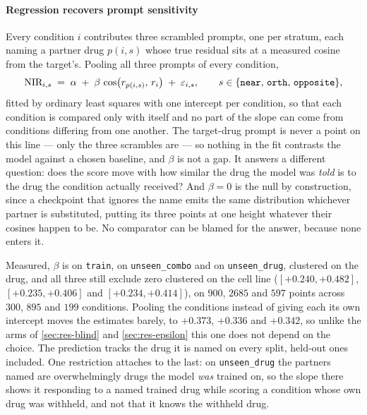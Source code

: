 \paragraph{Regression recovers prompt sensitivity} 

Every condition $i$ contributes three scrambled prompts, one per stratum,
each naming a partner drug $p(i,s)$ whose true residual sits at a measured cosine
from the target's. Pooling all three prompts of every condition,
\begin{equation}
 \textrm{NIR}_{i,s} \;=\; \alpha \;+\; \beta\,
   \cos\!\big(r_{p(i,s)},\, r_{i}\big) \;+\; \varepsilon_{i,s},
 \qquad s \in \{\texttt{near},\, \texttt{orth},\, \texttt{opposite}\},
\end{equation}
fitted by ordinary least squares with one intercept per condition, so that each
condition is compared only with itself and no part of the slope can come from
conditions differing from one another. The target-drug prompt is never a point on
this line --- only
the three scrambles are --- so nothing in the fit contrasts the model against a
chosen baseline, and $\beta$ is not a gap. It answers a different question: does
the score move with how similar the drug the model was \emph{told} is to the drug
the condition actually received? And $\beta = 0$ is the null by construction, since
a checkpoint that ignores the name emits the same distribution whichever partner
is substituted, putting its three points at one height whatever their cosines
happen to be. No comparator can be blamed for the answer, because none enters it.

Measured, $\beta$ is  on \texttt{train},
 on \texttt{unseen\_combo} and
 on \texttt{unseen\_drug}, clustered on the drug, and
all three still exclude zero clustered on the cell line ($[+0.240, +0.482]$,
$[+0.235, +0.406]$ and $[+0.234, +0.414]$), on $900$, $\num{2685}$ and $597$
points across $300$, $895$ and $199$ conditions. Pooling the conditions instead
of giving each its own intercept moves the estimates barely, to $+0.373$, $+0.336$
and $+0.342$, so unlike the arms of \cref{sec:res-blind} and
\cref{sec:res-epsilon} this one does not depend on the choice. The prediction tracks the drug it is named on every split,
held-out ones included. One restriction attaches to the last: on
\texttt{unseen\_drug} the partners named are overwhelmingly drugs the model
\emph{was} trained on, so the slope there shows it responding to a named trained
drug while scoring a condition whose own drug was withheld, and not that it knows
the withheld drug.


